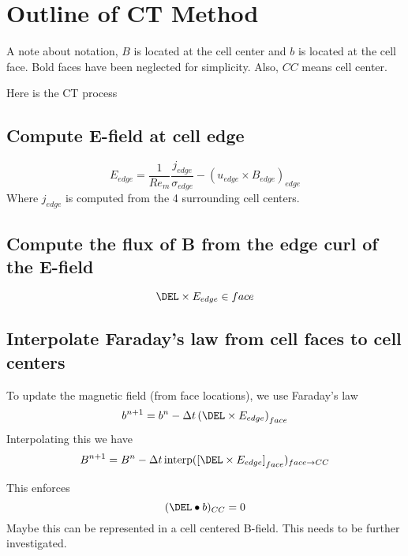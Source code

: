 \documentclass[11pt]{article}
\begin{document}
\doublespacing
\MOONSTITLE
\maketitle

\section{Outline of CT Method}
A note about notation, $B$ is located at the cell center and $b$ is located at the cell face. Bold faces have been neglected for simplicity. Also, $CC$ means cell center.

Here is the CT process
\subsection{Compute E-field at cell edge}
\begin{equation}
	E_{edge} = \frac{1}{Re_m} \frac{j_{edge}}{\sigma_{edge}} -
	(u_{edge} \times B_{edge})_{edge}
\end{equation}
Where $j_{edge}$ is computed from the 4 surrounding cell centers.

\subsection{Compute the flux of B from the edge curl of the E-field}

\begin{equation}
	\DEL \times E_{edge} \in face
\end{equation}

\subsection{Interpolate Faraday's law from cell faces to cell centers}
To update the magnetic field (from face locations), we use Faraday's law
\begin{equation}
	b^{n+1} = b^{n} - \Delta t
	\left(
	\DEL \times E_{edge}
	\right)_{face}
\end{equation}
Interpolating this we have
\begin{equation}
	B^{n+1} = B^{n} - \Delta t \,
	\text{interp}(
	\left[
	\DEL \times E_{edge}
	\right]_{face}
	)_{face \rightarrow CC}
\end{equation}

This enforces
\begin{equation}
	(\DEL \bullet b)_{CC} = 0
\end{equation}
Maybe this can be represented in a cell centered B-field. This needs to be further investigated.
\end{document}
